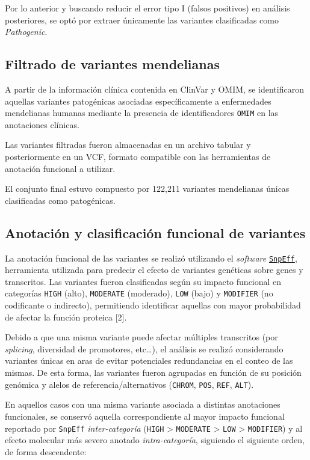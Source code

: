 \documentclass[
  spanish,
  11pt,
]{article}
\begin{document}
Por lo anterior y buscando reducir el error tipo I (falsos positivos) en
análisis posteriores, se optó por extraer únicamente las variantes
clasificadas como \emph{Pathogenic}.

\subsection{Filtrado de variantes
mendelianas}\label{filtrado-de-variantes-mendelianas}

A partir de la información clínica contenida en ClinVar y OMIM, se
identificaron aquellas variantes patogénicas asociadas específicamente a
enfermedades mendelianas humanas mediante la presencia de
identificadores \texttt{OMIM} en las anotaciones clínicas.

Las variantes filtradas fueron almacenadas en un archivo tabular y
posteriormente en un VCF, formato compatible con las herramientas de
anotación funcional a utilizar.

El conjunto final estuvo compuesto por 122,211 variantes mendelianas
únicas clasificadas como patogénicas.

\subsection{Anotación y clasificación funcional de
variantes}\label{anotaciuxf3n-y-clasificaciuxf3n-funcional-de-variantes}

La anotación funcional de las variantes se realizó utilizando el
\emph{software}
\href{https://pcingola.github.io/SnpEff/}{\texttt{SnpEff}}, herramienta
utilizada para predecir el efecto de variantes genéticas sobre genes y
transcritos. Las variantes fueron clasificadas según su impacto
funcional en categorías \texttt{HIGH} (alto), \texttt{MODERATE}
(moderado), \texttt{LOW} (bajo) y \texttt{MODIFIER} (no codificante o
indirecto), permitiendo identificar aquellas con mayor probabilidad de
afectar la función proteica {[}2{]}.

Debido a que una misma variante puede afectar múltiples transcritos (por
\emph{splicing}, diversidad de promotores, etc\ldots), el análisis se
realizó considerando variantes únicas en aras de evitar potenciales
redundancias en el conteo de las mismas. De esta forma, las variantes
fueron agrupadas en función de su posición genómica y alelos de
referencia/alternativos (\texttt{CHROM}, \texttt{POS}, \texttt{REF},
\texttt{ALT}).

En aquellos casos con una misma variante asociada a distintas
anotaciones funcionales, se conservó aquella correspondiente al mayor
impacto funcional reportado por \texttt{SnpEff} \emph{inter-categoría}
(\texttt{HIGH} \textgreater{} \texttt{MODERATE} \textgreater{}
\texttt{LOW} \textgreater{} \texttt{MODIFIER}) y al efecto molecular más
severo anotado \emph{intra-categoría}, siguiendo el siguiente orden, de
forma descendente:
\end{document}
